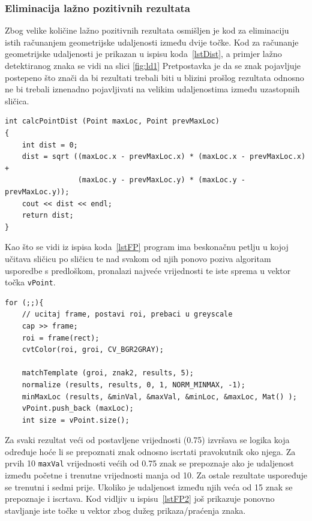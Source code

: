 \newpage
\subsubsection{Eliminacija lažno pozitivnih rezultata} %
\label{ssub:Eliminacija lažno pozitivnih rezultata}

Zbog velike količine lažno pozitivnih rezultata osmišljen je kod za
eliminaciju istih računanjem geometrijske udaljenosti između dvije
točke. Kod za računanje geometrijske udaljenosti je prikazan u ispisu
koda~\ref{lstDist}, a primjer lažno detektiranog znaka se vidi na slici
\ref{fig:ld1} Pretpostavka je da se znak pojavljuje postepeno što
znači da bi rezultati trebali biti u blizini prošlog rezultata odnosno ne
bi trebali iznenadno pojavljivati na velikim udaljenostima između
uzastopnih sličica. 

\begin{lstlisting}[label=lstDist,caption={Izvorni kod računanja
geometrijske udaljenosti između dvije točke}]
int calcPointDist (Point maxLoc, Point prevMaxLoc)
{
    int dist = 0;
    dist = sqrt ((maxLoc.x - prevMaxLoc.x) * (maxLoc.x - prevMaxLoc.x) +
                 (maxLoc.y - prevMaxLoc.y) * (maxLoc.y - prevMaxLoc.y));    
    cout << dist << endl;
    return dist;
}
\end{lstlisting}

Kao što se vidi iz ispisa koda~\ref{lstFP} program ima beskonačnu petlju
u kojoj učitava sličicu po sličicu te nad svakom od njih ponovo poziva
algoritam usporedbe s predloškom, pronalazi najveće vrijednosti te 
iste sprema u vektor točka \texttt{vPoint}. 

\begin{lstlisting}[label=lstFP,caption={Izvorni kod obrade svih učitanih
        sličica }]
for (;;){
    // ucitaj frame, postavi roi, prebaci u greyscale
    cap >> frame;              
    roi = frame(rect);
    cvtColor(roi, groi, CV_BGR2GRAY);
    
    matchTemplate (groi, znak2, results, 5);
    normalize (results, results, 0, 1, NORM_MINMAX, -1);
    minMaxLoc (results, &minVal, &maxVal, &minLoc, &maxLoc, Mat() );
    vPoint.push_back (maxLoc);
    int size = vPoint.size();
\end{lstlisting}
    
Za svaki rezultat veći od postavljene vrijednosti (0.75) izvršava se
logika koja određuje hoće li se prepoznati znak odnosno iscrtati
pravokutnik oko njega. Za prvih 10 \texttt{maxVal} vrijednosti većih od
0.75 znak se prepoznaje ako je udaljenost između početne i trenutne
vrijednosti manja od 10. Za ostale rezultate uspoređuje se trenutni i
sedmi prije. Ukoliko je udaljenost između njih veća od 15 znak se
prepoznaje i iscrtava. Kod vidljiv u ispisu~\ref{lstFP2} još prikazuje
ponovno stavljanje iste točke u vektor zbog dužeg prikaza/praćenja
znaka. 

